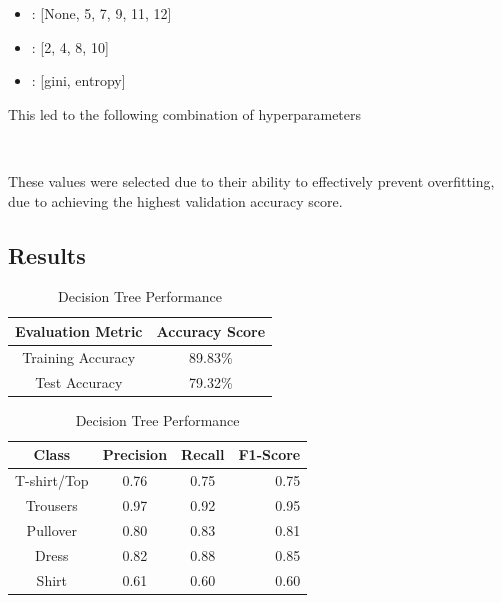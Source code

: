 \begin{center}
    \begin{minipage}{3in}

\begin{itemize}
    \item {}: [None, 5, 7, 9, 11, 12]
    \item {}: [2, 4, 8, 10]
    \item {}: [gini, entropy] \\
\end{itemize}
            \end{minipage}
\end{center}


This led to the following combination of hyperparameters\\
\begin{tcolorbox}[colback=white,
                  arc=0pt,
                outer=0pt]
\centering {} \, \,  \, \, \\
   \end{tcolorbox}

These values were selected due to their ability to effectively prevent overfitting, due to achieving the highest validation accuracy score.

\subsection{Results}\label{subsec:results}
\begin{table}[!ht]
\begin{subtable}[c]{0.4\textwidth}
\footnotesize
\centering
\begin{tabular}{ c | c }
 \toprule
 Evaluation Metric & Accuracy Score  \\
 \midrule
 Training Accuracy &  89.83\% \\
 Test Accuracy &79.32\% \\
 \bottomrule
\end{tabular}
\captionsetup{justification=centering,margin=1cm}
\end{subtable}
\begin{subtable}[c]{0.6\textwidth}
\footnotesize
\centering
\begin{tabular}{c | c c r}
Class & Precision & Recall & F1-Score\\
\midrule
T-shirt/Top   &    0.76  &    0.75  &    0.75 \\
Trousers   &    0.97  &    0.92  &    0.95 \\
Pullover   &    0.80  &    0.83  &    0.81\\
Dress   &    0.82  &    0.88  &    0.85\\
Shirt   &    0.61  &    0.60  &    0.60\\
\end{tabular}
\captionsetup{justification=centering,margin=1cm}
\end{subtable}
\caption{Decision Tree Performance}
\label{tab:dt_evaluation}
\end{table}\\


